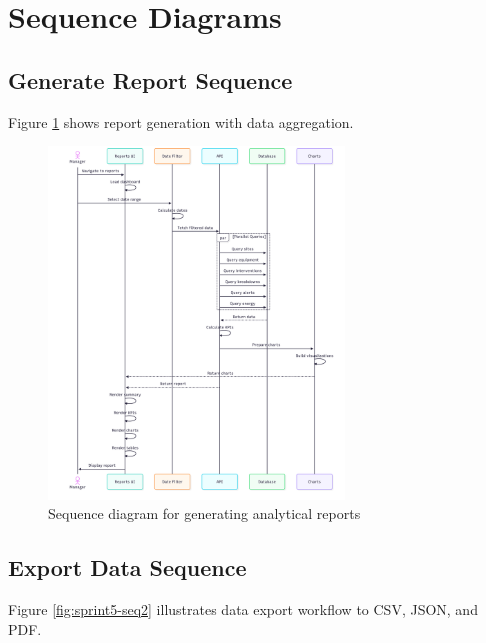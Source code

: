 \section{Sequence Diagrams}

\subsection{Generate Report Sequence}

Figure \ref{fig:sprint5-seq1} shows report generation with data aggregation.

\begin{figure}[H]
\centering
\includegraphics[width=0.7\textwidth]{img/chap_07/sprint5_sequence_report.png}
\caption{Sequence diagram for generating analytical reports}
\label{fig:sprint5-seq1}
\end{figure}

\subsection{Export Data Sequence}

Figure \ref{fig:sprint5-seq2} illustrates data export workflow to CSV, JSON, and PDF.

